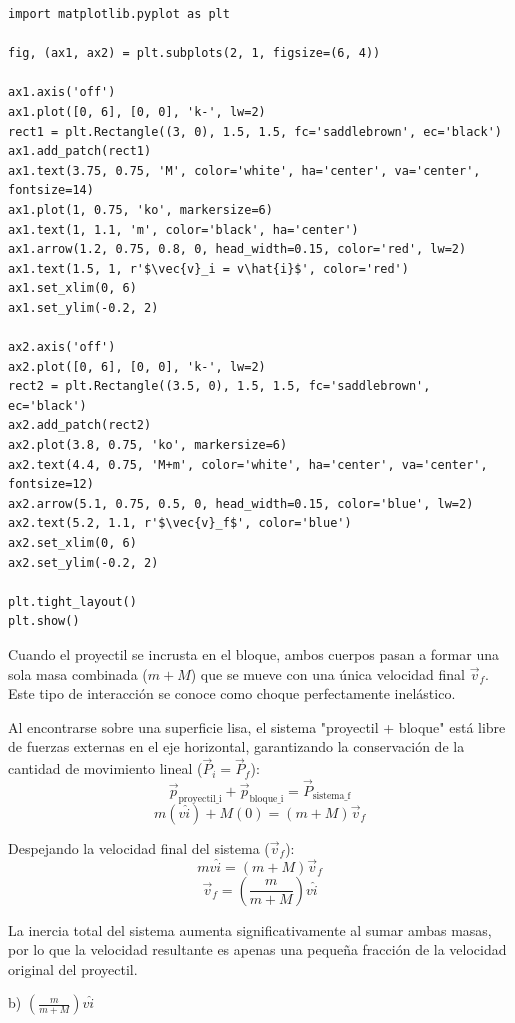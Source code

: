 \documentclass[12pt, a4paper]{article}
\begin{document}
\begin{verbatim}
import matplotlib.pyplot as plt

fig, (ax1, ax2) = plt.subplots(2, 1, figsize=(6, 4))

ax1.axis('off')
ax1.plot([0, 6], [0, 0], 'k-', lw=2)
rect1 = plt.Rectangle((3, 0), 1.5, 1.5, fc='saddlebrown', ec='black')
ax1.add_patch(rect1)
ax1.text(3.75, 0.75, 'M', color='white', ha='center', va='center', fontsize=14)
ax1.plot(1, 0.75, 'ko', markersize=6)
ax1.text(1, 1.1, 'm', color='black', ha='center')
ax1.arrow(1.2, 0.75, 0.8, 0, head_width=0.15, color='red', lw=2)
ax1.text(1.5, 1, r'$\vec{v}_i = v\hat{i}$', color='red')
ax1.set_xlim(0, 6)
ax1.set_ylim(-0.2, 2)

ax2.axis('off')
ax2.plot([0, 6], [0, 0], 'k-', lw=2)
rect2 = plt.Rectangle((3.5, 0), 1.5, 1.5, fc='saddlebrown', ec='black')
ax2.add_patch(rect2)
ax2.plot(3.8, 0.75, 'ko', markersize=6)
ax2.text(4.4, 0.75, 'M+m', color='white', ha='center', va='center', fontsize=12)
ax2.arrow(5.1, 0.75, 0.5, 0, head_width=0.15, color='blue', lw=2)
ax2.text(5.2, 1.1, r'$\vec{v}_f$', color='blue')
ax2.set_xlim(0, 6)
ax2.set_ylim(-0.2, 2)

plt.tight_layout()
plt.show()
\end{verbatim}

Cuando el proyectil se incrusta en el bloque, ambos cuerpos pasan a formar una sola masa combinada ($m + M$) que se mueve con una única velocidad final $\vec{v}_f$. Este tipo de interacción se conoce como choque perfectamente inelástico.

Al encontrarse sobre una superficie lisa, el sistema "proyectil + bloque" está libre de fuerzas externas en el eje horizontal, garantizando la conservación de la cantidad de movimiento lineal ($\vec{P}_i = \vec{P}_f$):
$$ \vec{p}_{\text{proyectil\_i}} + \vec{p}_{\text{bloque\_i}} = \vec{P}_{\text{sistema\_f}} $$
$$ m(v\hat{i}) + M(0) = (m + M)\vec{v}_f $$

Despejando la velocidad final del sistema ($\vec{v}_f$):
$$ mv\hat{i} = (m + M)\vec{v}_f $$
$$ \vec{v}_f = \left(\frac{m}{m+M}\right)v\hat{i} $$

La inercia total del sistema aumenta significativamente al sumar ambas masas, por lo que la velocidad resultante es apenas una pequeña fracción de la velocidad original del proyectil.

\begin{tcolorbox}[colback=green!5!white, colframe=green!50!black, title=Respuesta Final]
\centering \Large b) $\left(\frac{m}{m+M}\right)v\hat{i}$
\end{tcolorbox}
\end{document}

